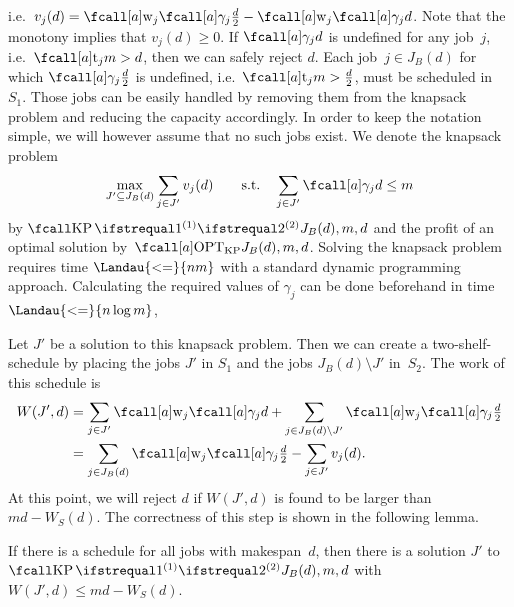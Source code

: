 i.e.~$v_j(d) = \work{j}{\procnum{j}{\frac{d}{2}}} - \work{j}{\procnum{j}{d}}$.
Note that the monotony implies that $v_j(d) \geq 0$.
If $\procnum{j}{d}$ is undefined for any job~$j$, i.e.~$\ptm{j}{m} > d$,
then we can safely reject $d$.
Each job~$j \in J_B(d)$ for which $\procnum{j}{\frac{d}{2}}$ is undefined,
i.e.~$\ptm{j}{m} > \frac{d}{2}$,
must be scheduled in~$S_1$.
Those jobs can be easily handled by removing them from the knapsack problem
and reducing the capacity accordingly.
In order to keep the notation simple,
we will however assume that no such jobs exist.
We denote the knapsack problem
\begin{equation}
  \begin{gathered}
    \max_{J' \subseteq J_B(d)} \sum_{j \in J'} v_j(d) \qquad
    \text{s.t.}\quad \sum_{j \in J'} \procnum{j}{d} \leq m
  \end{gathered}
\end{equation}
by $\KP{J_B(d)}{m,d}$ and the profit of an optimal solution by~$\KPOPT{J_B(d)}{m,d}$.
Solving the knapsack problem requires time $\Landau{<=}{nm}$
with a standard dynamic programming approach.
Calculating the required values of $\gamma_j$ can be done beforehand in time~$\Landau{<=}{n \log m}$,

Let $J'$ be a solution to this knapsack problem.
Then we can create a two-shelf-schedule
by placing the jobs $J'$ in $S_1$ and the jobs $J_B(d) \setminus J'$ in~$S_2$.
The work of this schedule is
\begin{equation}
  \label{eq:two-shelf-work}
  \begin{aligned}
    W(J',d) &= \sum_{j \in J'} \work{j}{\procnum{j}{d}} +
\sum_{j \in J_B(d) \setminus J'} \work{j}{\procnum{j}{\textstyle\frac{d}{2}}} \\
    &= \sum_{j \in J_B(d)} \work{j}{\procnum{j}{\textstyle\frac{d}{2}}} - \sum_{j \in J'} v_j(d) \dpunct{.}
  \end{aligned}
\end{equation}
At this point, we will reject $d$ if $W(J',d)$ is found to be larger than $md - W_S(d)$.
The correctness of this step is shown in the following lemma.

\begin{lemma}
  \label{lemma:two-shelf-schedule}
  If there is a schedule for all jobs with makespan~$d$,
  then there is a solution $J'$ to $\KP{J_B(d)}{m,d}$
  with $W(J', d) \leq md - W_S(d)$.
\end{lemma}

